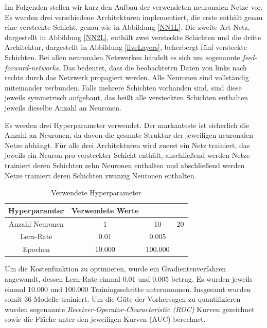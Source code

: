\documentclass{article}
\begin{document}
Im Folgenden stellen wir kurz den Aufbau der verwendeten neuronalen Netze vor. Es wurden drei verschiedene Architekturen implementiert, die erste enthält genau eine versteckte Schicht, genau wie in Abbildung \ref{NN1L}. Die zweite Art Netz, dargestellt in Abbildung \ref{NN2L}, enthält zwei versteckte Schichten und die dritte Architektur, dargestellt in Abbildung \ref{fiveLayers}, beherbergt fünf versteckte Schichten. Bei allen neuronalen Netzwerken handelt es sich um sogenannte \textit{feed-forward-networks}. Das bedeutet, dass die beobachteten Daten von links nach rechts durch das Netzwerk propagiert werden. Alle Neuronen sind vollständig miteinander verbunden. Falls mehrere Schichten vorhanden sind, sind diese jeweils symmetrisch aufgebaut, das heißt alle versteckten Schichten enthalten jeweils dieselbe Anzahl an Neuronen.

Es werden drei Hyperparameter verwendet. Der markanteste ist sicherlich die Anzahl an Neuronen, da davon die gesamte Struktur der jeweiligen neuronalen Netze abhängt. Für alle drei Architekturen wird zuerst ein Netz trainiert, das jeweils ein Neuron pro versteckter Schicht enthält, anschließend werden Netze trainiert deren Schichten zehn Neuronen enthalten und abschließend werden Netze trainiert deren Schichten zwanzig Neuronen enthalten. 

\begin{table}
\begin{center}
\centering
\caption{Verwendete Hyperparameter}
\vspace{1mm}
\begin{tabular}{cccc}
\hline\hline
Hyperparamter & Verwendete Werte & \\
\hline
Anzahl Neuronen & 1 & 10 & 20 \\
Lern-Rate       & 0.01 & 0.005 & \\
Epochen & 10.000 & 100.000 & \\
\hline
\end{tabular}
\end{center}
\end{table}

Um die Kostenfunktion zu optimieren, wurde ein Gradientenverfahren angewandt, dessen Lern-Rate einmal $0.01$ und $0.005$ betrug. Es wurden jeweils einmal 10.000 und 100.000 Trainingsschritte unternommen. Insgesamt wurden somit 36 Modelle trainiert. Um die Güte der Vorhersagen zu quantifizieren wurden sogenannte \textit{Receiver-Operator-Characteristic (ROC)} Kurven gezeichnet sowie die Fläche unter den jeweiligen Kurven (AUC) berechnet.  
\end{document}
